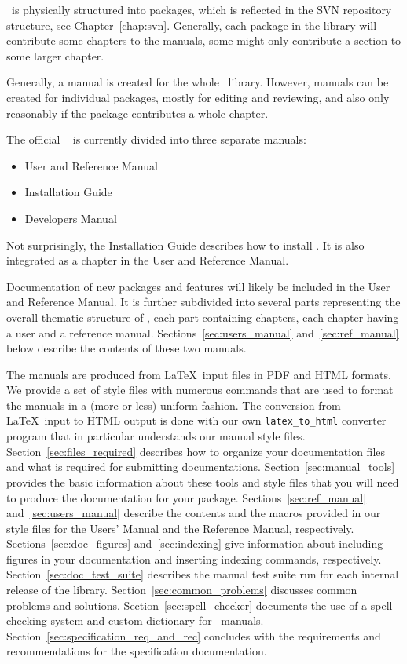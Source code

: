 \cgal\ is physically structured into
packages, which is reflected in the SVN
repository structure, see Chapter~\ref{chap:svn}.  Generally, each
package in the library will contribute some chapters to the manuals,
some might only contribute a section to some larger chapter.

Generally, a manual is created for the whole \cgal\ library.
However, manuals can be created for individual packages,
mostly for editing and reviewing, and also only reasonably if the
package contributes a whole chapter.

The official \cgal\
is currently divided into three separate manuals:
\begin{itemize}
   \item User and Reference Manual
   \item Installation Guide
   \item Developers Manual
\end{itemize}
Not surprisingly, the Installation Guide describes how to install \cgal
\ccIndexMainItem{installation}. It is also integrated as a chapter in the
User and Reference Manual.

Documentation of new packages and features will likely be included in
the User and Reference Manual.  It is further
subdivided into several parts representing the overall thematic structure
of \cgal, each part containing chapters, each chapter having a user
and a reference manual.
Sections~\ref{sec:users_manual} and~\ref{sec:ref_manual} below
describe the contents of these two manuals.

The manuals are produced from \LaTeX\ input files in PDF and
HTML formats. We provide a set of style files with numerous commands
that are used to format the manuals in a (more or less) uniform fashion.
The conversion from \LaTeX\ input to HTML output is done with
our own \texttt{latex\_to\_html} converter program that in particular
understands our manual style files.
Section~\ref{sec:files_required} describes how to organize your
documentation files and what is required for submitting documentations.
Section~\ref{sec:manual_tools} provides the basic information about
these tools and style files that you will need to produce
the documentation for your package.
Sections~\ref{sec:ref_manual} and~\ref{sec:users_manual} describe the
contents and the macros provided in our style files for the Users'
Manual and the Reference Manual, respectively.
Sections~\ref{sec:doc_figures} and~\ref{sec:indexing} give information
about including figures in your documentation and inserting indexing
commands, respectively.
Section~\ref{sec:doc_test_suite} describes the manual test suite run
for each internal release of the library.
Section~\ref{sec:common_problems} discusses common problems and
solutions.
Section~\ref{sec:spell_checker} documents the use of a spell checking system
and custom dictionary for \cgal\ manuals.
Section~\ref{sec:specification_req_and_rec} concludes with the
requirements and recommendations for the specification documentation.

